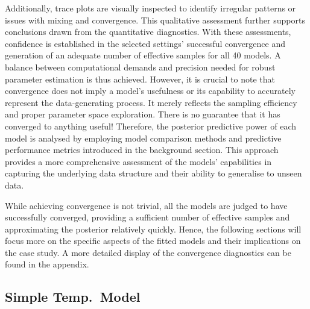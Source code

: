 Additionally, trace plots are visually inspected to identify irregular patterns
or issues with mixing and convergence. This qualitative
assessment further supports conclusions drawn from the quantitative
diagnostics.
With these assessments, confidence is established in the selected settings'
successful convergence and generation of an adequate number of effective
samples for all 40 models. A balance between computational demands and
precision needed for robust parameter estimation is thus achieved. However, it
is crucial to note that convergence does not imply a model's usefulness or its
capability to accurately represent the data-generating process. It merely
reflects the sampling efficiency and proper parameter space exploration. There
is no guarantee that it has converged to anything useful! Therefore, the
posterior predictive power of each model is analysed by employing model
comparison methods and predictive performance metrics introduced in the
background section. This approach provides a more comprehensive assessment of
the models' capabilities in capturing the underlying data structure and their
ability to generalise to unseen data.

While achieving convergence is not trivial, all the models are judged to have
successfully converged, providing a sufficient number of effective samples and
approximating the posterior relatively quickly. Hence, the following sections
will focus more on the specific aspects of the fitted models and their
implications on the case study. A more detailed display of the convergence
diagnostics can be found in the appendix.

\subsection{Simple Temp.\ Model}

